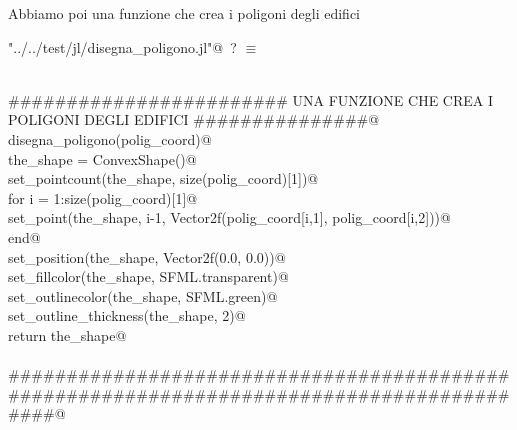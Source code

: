 \documentclass[]{article}
\begin{document}
Abbiamo poi una funzione che crea i poligoni degli edifici
\begin{flushleft} \small
\begin{minipage}{\linewidth} \label{scrap4}
\protect{}\verb@"../../test/jl/disegna_poligono.jl"@\nobreak\ {\footnotesize ? }$\equiv$
\vspace{-1ex}
\begin{list}{}{} \item
\mbox{}\verb@@\\
\mbox{}\verb@######################## UNA FUNZIONE CHE CREA I POLIGONI DEGLI EDIFICI ###############@\\
\mbox{}\verb@function disegna_poligono(polig_coord)@\\
\mbox{}\verb@   the_shape = ConvexShape()@\\
\mbox{}\verb@   set_pointcount(the_shape, size(polig_coord)[1])@\\
\mbox{}\verb@   for i = 1:size(polig_coord)[1]@\\
\mbox{}\verb@      set_point(the_shape, i-1, Vector2f(polig_coord[i,1], polig_coord[i,2]))@\\
\mbox{}\verb@   end@\\
\mbox{}\verb@   set_position(the_shape, Vector2f(0.0, 0.0))@\\
\mbox{}\verb@   set_fillcolor(the_shape, SFML.transparent)@\\
\mbox{}\verb@   set_outlinecolor(the_shape, SFML.green)@\\
\mbox{}\verb@   set_outline_thickness(the_shape, 2)@\\
\mbox{}\verb@   return the_shape@\\
\mbox{}\verb@end@\\
\mbox{}\verb@##########################################################################################@\\
\mbox{}\verb@@\\
\mbox{}\verb@@{\NWsep}
\end{list}
\vspace{-2ex}
\end{minipage}\\[4ex]
\end{flushleft}

%
\end{document}
